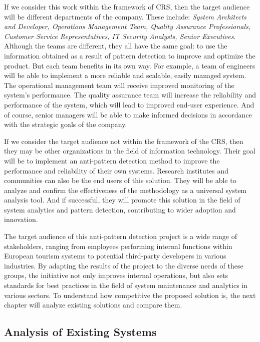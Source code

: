 \documentclass[12pt, times]{article}
\begin{document}
	\hspace*{5mm}If we consider this work within the framework of CRS, then the target audience will be different departments of the company. These include: \textit{System Architects and Developer, Operations Management Team, Quality Assurance Professionals, Customer Service Representatives, IT Security Analysts, Senior Executives}. Although the teams are different, they all have the same goal: to use the information obtained as a result of pattern detection to improve and optimize the product. But each team benefits in its own way. For example, a team of engineers will be able to implement a more reliable and scalable, easily managed system. The operational management team will receive improved monitoring of the system's performance. The quality assurance team will increase the reliability and performance of the system, which will lead to improved end-user experience. And of course, senior managers will be able to make informed decisions in accordance with the strategic goals of the company.
	
	\hspace*{5mm}If we consider the target audience not within the framework of the CRS, then they may be other organizations in the field of information technology. Their goal will be to implement an anti-pattern detection method to improve the performance and reliability of their own systems. Research institutes and communities can also be the end users of this solution. They will be able to analyze and confirm the effectiveness of the methodology as a universal system analysis tool. And if successful, they will promote this solution in the field of system analytics and pattern detection, contributing to wider adoption and innovation.
	
	\hspace*{5mm}The target audience of this anti-pattern detection project is a wide range of stakeholders, ranging from employees performing internal functions within European tourism systems to potential third-party developers in various industries. By adapting the results of the project to the diverse needs of these groups, the initiative not only improves internal operations, but also sets standards for best practices in the field of system maintenance and analytics in various sectors. To understand how competitive the proposed solution is, the next chapter will analyze existing solutions and compare them.
	
\subsection{Analysis of Existing Systems}
\end{document}
